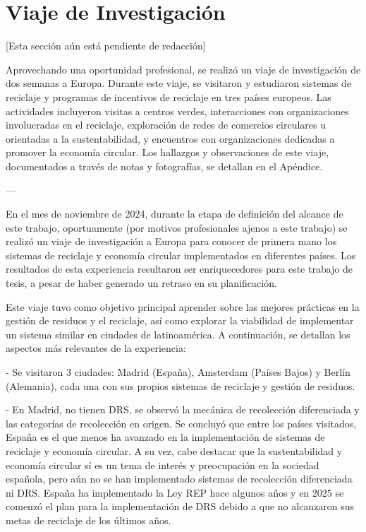 \chapter{Viaje de Investigación}
\label{cp:europe-trip}

[Esta sección aún está pendiente de redacción]

Aprovechando una oportunidad profesional, se realizó un viaje de investigación de dos semanas a Europa.
Durante este viaje, se visitaron y estudiaron sistemas de reciclaje y programas de incentivos de reciclaje en tres países europeos.
Las actividades incluyeron visitas a centros verdes, interacciones con organizaciones involucradas en el reciclaje, exploración de redes de comercios circulares u orientadas a la sustentabilidad, y encuentros con organizaciones dedicadas a promover la economía circular.
Los hallazgos y observaciones de este viaje, documentados a través de notas y fotografías, se detallan en el Apéndice.

---

En el mes de noviembre de 2024, durante la etapa de definición del alcance de este trabajo, oportuamente (por motivos profesionales ajenos a este trabajo) se realizó un viaje de investigación a Europa para conocer de primera mano los sistemas de reciclaje y economía circular implementados en diferentes países. Los resultados de esta experiencia resultaron ser enriquecedores para este trabajo de tesis, a pesar de haber generado un retraso en su planificación.

Este viaje tuvo como objetivo principal aprender sobre las mejores prácticas en la gestión de residuos y el reciclaje, así como explorar la viabilidad de implementar un sistema similar en ciudades de latinoamérica. A continuación, se detallan los aspectos más relevantes de la experiencia:

- Se visitaron 3 ciudades: Madrid (España), Amsterdam (Países Bajos) y Berlín (Alemania), cada una con sus propios sistemas de reciclaje y gestión de residuos.

- En Madrid, no tienen DRS, se observó la mecánica de recolección diferenciada y las categorías de recolección en origen. Se concluyó que entre los países visitados, España es el que menos ha avanzado en la implementación de sistemas de reciclaje y economía circular. A su vez, cabe destacar que la sustentabilidad y economía circular sí es un tema de interés y preocupación en la sociedad española, pero aún no se han implementado sistemas de recolección diferenciada ni DRS. España ha implementado la Ley REP hace algunos años y en 2025 se comenzó el plan para la implementación de DRS debido a que no alcanzaron sus metas de reciclaje de los últimos años.

